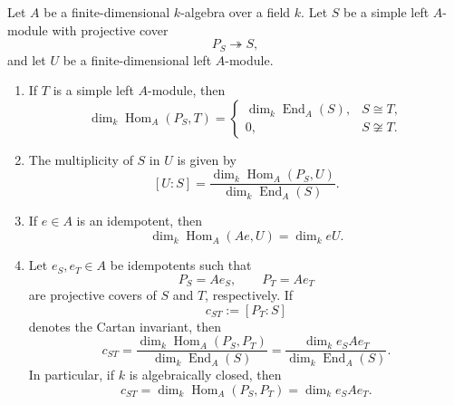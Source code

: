 \begin{proposition}
    Let \(A\) be a finite-dimensional \(k\)-algebra over a field \(k\). Let \(S\) be a
    simple left \(A\)-module with projective cover
    \[
        P_S \twoheadrightarrow S,
    \]
    and let \(U\) be a finite-dimensional left \(A\)-module.

    \begin{enumerate}
        \item If \(T\) is a simple left \(A\)-module, then
              \[
                  \dim_k \operatorname{Hom}_A(P_S,T)
                  =
                  \begin{cases}
                      \dim_k \operatorname{End}_A(S), & S\cong T,     \\
                      0,                              & S\not\cong T.
                  \end{cases}
              \]

        \item The multiplicity of \(S\) in \(U\) is given by
              \[
                  [U:S]
                  =
                  \frac{\dim_k \operatorname{Hom}_A(P_S,U)}
                  {\dim_k \operatorname{End}_A(S)}.
              \]

        \item If \(e\in A\) is an idempotent, then
              \[
                  \dim_k \operatorname{Hom}_A(Ae,U)=\dim_k eU.
              \]

        \item Let \(e_S,e_T\in A\) be idempotents such that
              \[
                  P_S=Ae_S,
                  \qquad
                  P_T=Ae_T
              \]
              are projective covers of \(S\) and \(T\), respectively. If
              \[
                  c_{ST}:=[P_T:S]
              \]
              denotes the Cartan invariant, then
              \[
                  c_{ST}
                  =
                  \frac{\dim_k \operatorname{Hom}_A(P_S,P_T)}
                  {\dim_k \operatorname{End}_A(S)}
                  =
                  \frac{\dim_k e_SAe_T}
                  {\dim_k \operatorname{End}_A(S)}.
              \]
              In particular, if \(k\) is algebraically closed, then
              \[
                  c_{ST}
                  =
                  \dim_k \operatorname{Hom}_A(P_S,P_T)
                  =
                  \dim_k e_SAe_T.
              \]
    \end{enumerate}
\end{proposition}

